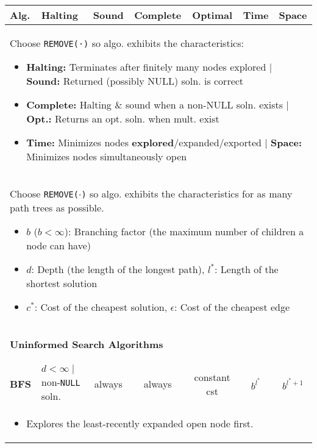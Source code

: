 \begin{summary}
    \begin{center}
        \begin{tabular}{llccccc}
        \toprule
        \textbf{Alg.} & Halting & Sound & Complete & Optimal & Time & Space \\
        \midrule
        \multicolumn{7}{p{\linewidth}}{
            Choose \texttt{REMOVE(·)} so algo. exhibits the characteristics:
            \begin{itemize}
                \item \textbf{Halting:} Terminates after finitely many nodes explored $\mid$ \textbf{Sound:} Returned (possibly NULL) soln. is correct 
                \item \textbf{Complete:} Halting \& sound when a non-NULL soln. exists $\mid$ \textbf{Opt.:} Returns an opt. soln. when mult. exist 
                \item \textbf{Time:} Minimizes nodes \textbf{explored}/expanded/exported $\mid$ \textbf{Space:} Minimizes nodes simultaneously open
            \end{itemize}} \\
        \midrule
        \multicolumn{7}{p{\linewidth}}{
            Choose \texttt{REMOVE($\cdot$)} so algo. exhibits the characteristics for as many path trees as possible. 
            \begin{itemize}
                \item $b$ ($b < \infty$): Branching factor (the maximum number of children a node can have)
                \item $d$: Depth (the length of the longest path), $l^*$: Length of the shortest solution
                \item $c^*$: Cost of the cheapest solution, $\epsilon$: Cost of the cheapest edge
            \end{itemize}} \\
        \midrule
        \multicolumn{7}{p{\linewidth}}{
        \begin{center}
            \textbf{Uninformed Search Algorithms}
        \end{center}} \\
        \midrule
        \textbf{BFS} & $d<\infty \mid$ non-\texttt{NULL} soln. & always & always & constant cst & $b^{l^{*}}$ & $b^{l^{*} + 1}$ \\
        \multicolumn{7}{p{\linewidth}}{
        \begin{itemize}
            \item Explores the least-recently expanded open node first.

\end{itemize}}
\end{tabular}
\end{center}
\end{summary}
